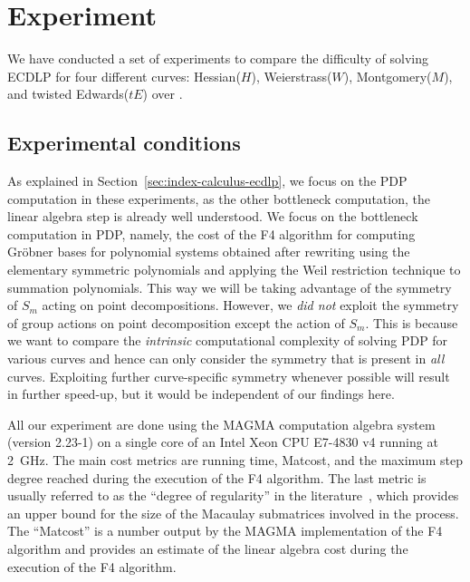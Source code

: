 \section{Experiment}
\label{sec:experiment}

We have conducted a set of experiments to compare the difficulty of
solving ECDLP for four different curves: Hessian($H$), Weierstrass($W$),
Montgomery($M$), and twisted Edwards($tE$) over .
%

\subsection{Experimental conditions}
\label{subsec:conditions}



As explained in Section~\ref{sec:index-calculus-ecdlp}, we focus on
the PDP computation in these experiments, as the other bottleneck
computation, the linear algebra step is already well understood.
%
We focus on the bottleneck computation in PDP, namely, the cost of the
F4 algorithm for computing Gr\"obner bases for polynomial systems
obtained after rewriting using the elementary symmetric polynomials
and applying the Weil restriction technique to summation polynomials.
%
This way we will be taking advantage of the symmetry of $S_m$ acting
on point decompositions.
% 
However, we \emph{did not} exploit the symmetry of group actions on
point decomposition except the action of $S_m$.
%
This is because we want to compare the \emph{intrinsic} computational
complexity of solving PDP for various curves and hence can only
consider the symmetry that is present in \emph{all} curves.
%
Exploiting further curve-specific symmetry whenever possible will
result in further speed-up, but it would be independent of our
findings here.

All our experiment are done using the MAGMA computation algebra system
(version 2.23-1) on a single core of an Intel Xeon CPU E7-4830 v4
running at 2~GHz.
%
The main cost metrics are running time, Matcost, and the maximum step
degree reached during the execution of the F4 algorithm.
%
The last metric is usually referred to as the ``degree of regularity''
in the literature~\cite{DBLP:conf/indocrypt/GalbraithG14}, which
provides an upper bound for the size of the Macaulay submatrices
involved in the process.
%
The ``Matcost'' is a number output by the MAGMA implementation of the
F4 algorithm and provides an estimate of the linear algebra cost
during the execution of the F4 algorithm.

